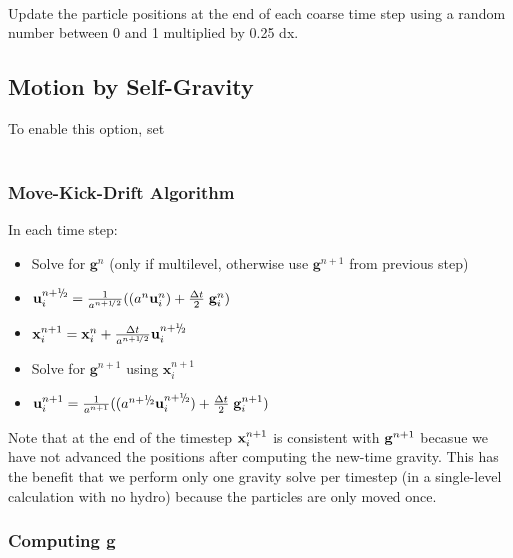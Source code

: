  \\

\noindent Update the particle positions at the end of each coarse time step using a 
random number between 0 and 1 multiplied by 0.25 dx.

\subsection{Motion by Self-Gravity}

\noindent To enable this option, set \\

 \\

\subsubsection{Move-Kick-Drift Algorithm}

In each time step:
\begin{itemize}
\item Solve for ${\mathbf g}^n$  (only if multilevel, otherwise use ${\mathbf g}^{n+1}$ from previous step)
\item ${\mathbf u}_i^{\nph} = \frac{1}{a^{\nph}} ( (a^n {\mathbf u}^n_i) + \frac{\dt}{2} \; {\mathbf g}^n_i )$
\item ${\mathbf x}_i^{n+1 } = {\mathbf x}^n_i +  \frac{\dt}{a^{\nph}}  {\mathbf u}_i^{\nph}$
\item Solve for ${\mathbf g}^{n+1}$ using ${\mathbf x}_i^{n+1}$
\item ${\mathbf u}_i^{n+1} = \frac{1}{a^{n+1}} ( (a^{\nph} {\mathbf u}^{\nph}_i) + \frac{\dt}{2} \; {\mathbf g}^{n+1}_i )$
\end{itemize}

Note that at the end of the timestep ${\bf x}_i^{n+1}$ is consistent with ${\bf g}^{n+1}$ becasue
we have not advanced the positions after computing the new-time gravity.  This has the benefit that
we perform only one gravity solve per timestep (in a single-level calculation with no hydro) because
the particles are only moved once.

\subsubsection{Computing {\bf g}}

